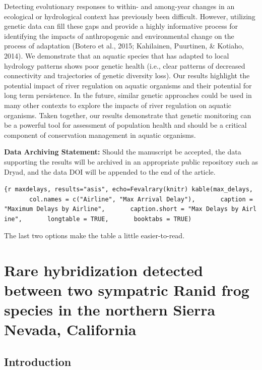 \documentclass[twoside,12pt,final]{ucthesis-CA2012}
\begin{document}
\begin{ucmainmatter}
Detecting evolutionary responses to within- and among-year changes in an
ecological or hydrological context has previously been difficult.
However, utilizing genetic data can fill these gaps and provide a highly
informative process for identifying the impacts of anthropogenic and
environmental change on the process of adaptation (Botero et al., 2015;
Kahilainen, Puurtinen, \& Kotiaho, 2014). We demonstrate that an aquatic
species that has adapted to local hydrology patterns shows poor genetic
health (i.e., clear patterns of decreased connectivity and trajectories
of genetic diversity loss). Our results highlight the potential impact
of river regulation on aquatic organisms and their potential for long
term persistence. In the future, similar genetic approaches could be
used in many other contexts to explore the impacts of river regulation
on aquatic organisms. Taken together, our results demonstrate that
genetic monitoring can be a powerful tool for assessment of population
health and should be a critical component of conservation management in
aquatic organisms.

\textbf{Data Archiving Statement:} Should the manuscript be accepted,
the data supporting the results will be archived in an appropriate
public repository such as Dryad, and the data DOI will be appended to
the end of the article.

\texttt{\{r\ maxdelays,\ results="asis",\ echo=Fevalrary(knitr)\ kable(max\_delays,\ \ \ \ \ \ \ \ col.names\ =\ c("Airline",\ "Max\ Arrival\ Delay"),\ \ \ \ \ \ \ caption\ =\ "Maximum\ Delays\ by\ Airline",\ \ \ \ \ \ \ caption.short\ =\ "Max\ Delays\ by\ Airline",\ \ \ \ \ \ \ longtable\ =\ TRUE,\ \ \ \ \ \ \ booktabs\ =\ TRUE)}

The last two options make the table a little easier-to-read.

\hypertarget{hybrids}{%
\chapter{Rare hybridization detected between two sympatric Ranid frog
species in the northern Sierra Nevada, California}\label{hybrids}}

\hypertarget{introduction-2}{%
\section{Introduction}\label{introduction-2}}


\end{ucmainmatter}
\end{document}
